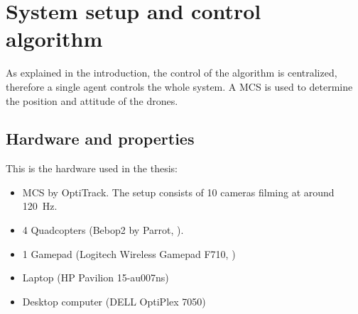 %
\chapter{System setup and control algorithm}

As explained in the introduction, the control of the algorithm is centralized, therefore a single agent controls the whole system. A \ac{MCS} is used to determine the position and attitude of the drones.

\label{chap::setup}
\section{Hardware and properties}
This is the hardware used in the thesis:
\begin{itemize}
	\item \ac{MCS} by OptiTrack. The setup consists of 10 cameras filming at around \SI{120}{\hertz}.
	\item 4 Quadcopters (Bebop2 by Parrot, ).
	\item 1 Gamepad (Logitech Wireless Gamepad F710, )
	\item Laptop (HP Pavilion 15-au007ns)
	\item Desktop computer (DELL OptiPlex 7050)
\end{itemize}

